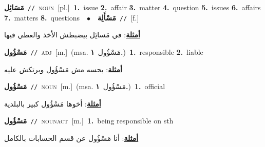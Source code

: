 \documentclass[10pt,a4paper,twoside]{article} %
\begin{document}
\begin{multicols}{2}
{\setlength\topsep{0pt}\textbf{\foreignlanguage{arabic}{مَسَائِل}}\ {\color{gray}\texttt{//}\color{black}}\ \textsc{noun}\ [pl.]\ \textbf{1.}~issue  \textbf{2.}~affair  \textbf{3.}~matter  \textbf{4.}~question  \textbf{5.}~issues  \textbf{6.}~affairs  \textbf{7.}~matters  \textbf{8.}~questions\ \ $\bullet$\ \ \setlength\topsep{0pt}\textbf{\foreignlanguage{arabic}{مَسْأَلِة}}\ {\color{gray}\texttt{//}\color{black}}\ [f.]\  \begin{flushright}\color{gray}\foreignlanguage{arabic}{\textbf{\underline{\foreignlanguage{arabic}{أمثلة}}}: في مَسائِل بيضبطش الأخذ والعطي فيها}\end{flushright}\color{black}} \vspace{2mm}

{\setlength\topsep{0pt}\textbf{\foreignlanguage{arabic}{مَسْؤُول}}\ {\color{gray}\texttt{//}\color{black}}\ \textsc{adj}\ [m.]\ \color{gray}(msa. \foreignlanguage{arabic}{مَسْؤُول}~\foreignlanguage{arabic}{\textbf{١.}})\color{black}\ \textbf{1.}~responsible  \textbf{2.}~liable\  \begin{flushright}\color{gray}\foreignlanguage{arabic}{\textbf{\underline{\foreignlanguage{arabic}{أمثلة}}}: بحسه مش مَسْؤُول وبرتكش عليه}\end{flushright}\color{black}} \vspace{2mm}

{\setlength\topsep{0pt}\textbf{\foreignlanguage{arabic}{مَسْؤُول}}\ {\color{gray}\texttt{//}\color{black}}\ \textsc{noun}\ [m.]\ \color{gray}(msa. \foreignlanguage{arabic}{مَسْؤُول}~\foreignlanguage{arabic}{\textbf{١.}})\color{black}\ \textbf{1.}~official\  \begin{flushright}\color{gray}\foreignlanguage{arabic}{\textbf{\underline{\foreignlanguage{arabic}{أمثلة}}}: أخوها مَسْؤُول كبير بالبلدية}\end{flushright}\color{black}} \vspace{2mm}

{\setlength\topsep{0pt}\textbf{\foreignlanguage{arabic}{مَسْؤُول}}\ {\color{gray}\texttt{//}\color{black}}\ \textsc{noun\textunderscore act}\ [m.]\ \textbf{1.}~being responsible on sth\  \begin{flushright}\color{gray}\foreignlanguage{arabic}{\textbf{\underline{\foreignlanguage{arabic}{أمثلة}}}: أنا مَسْؤُول عن قسم الحسابات بالكامل}\end{flushright}\color{black}} \vspace{2mm}


\end{multicols}
\end{document}
